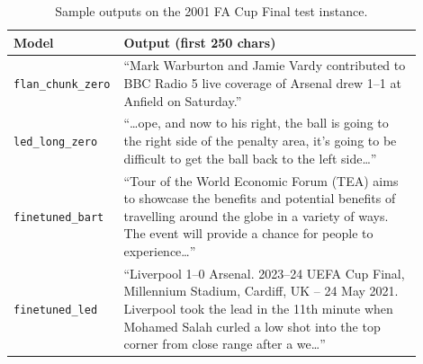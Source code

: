 \documentclass[10pt,a4paper]{article}
\begin{document}
\begin{table}[h]
\centering\small
\begin{tabular}{p{0.18\linewidth}p{0.72\linewidth}}
\toprule
\textbf{Model} & \textbf{Output (first 250 chars)} \\
\midrule
\texttt{flan\_chunk\_zero} & ``Mark Warburton and Jamie Vardy contributed to BBC Radio 5 live coverage of Arsenal drew 1--1 at Anfield on Saturday.'' \\
\texttt{led\_long\_zero}   & ``\dots ope, and now to his right, the ball is going to the right side of the penalty area, it's going to be difficult to get the ball back to the left side\dots'' \\
\texttt{finetuned\_bart}   & ``Tour of the World Economic Forum (TEA) aims to showcase the benefits and potential benefits of travelling around the globe in a variety of ways. The event will provide a chance for people to experience\dots'' \\
\texttt{finetuned\_led}    & ``Liverpool 1--0 Arsenal. 2023--24 UEFA Cup Final, Millennium Stadium, Cardiff, UK -- 24 May 2021. Liverpool took the lead in the 11th minute when Mohamed Salah curled a low shot into the top corner from close range after a we\dots'' \\
\bottomrule
\end{tabular}
\caption{Sample outputs on the 2001 FA Cup Final test instance.}
\label{tab:samples}
\end{table}
\end{document}
